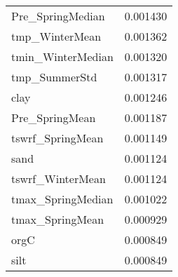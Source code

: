 \begin{tabular}{lr}
Pre_SpringMedian & 0.001430 \\
tmp_WinterMean & 0.001362 \\
tmin_WinterMedian & 0.001320 \\
tmp_SummerStd & 0.001317 \\
clay & 0.001246 \\
Pre_SpringMean & 0.001187 \\
tswrf_SpringMean & 0.001149 \\
sand & 0.001124 \\
tswrf_WinterMean & 0.001124 \\
tmax_SpringMedian & 0.001022 \\
tmax_SpringMean & 0.000929 \\
orgC & 0.000849 \\
silt & 0.000849 \\
\bottomrule
\end{tabular}
